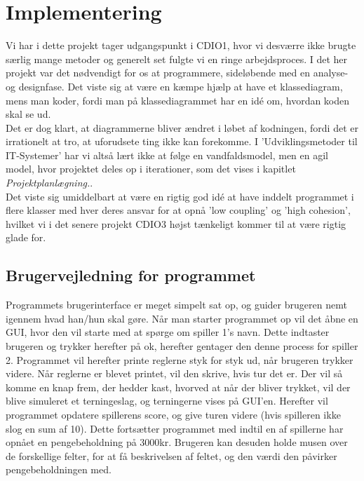 \chapter{Implementering}
Vi har i dette projekt tager udgangspunkt i CDIO1, hvor vi desværre ikke brugte særlig mange metoder og generelt set fulgte vi en ringe arbejdsproces.
I det her projekt var det nødvendigt for os at programmere, sideløbende med en analyse- og designfase.
Det viste sig at være en kæmpe hjælp at have et klassediagram, mens man koder, fordi man på klassediagrammet har en idé om, hvordan koden skal se ud.
\\
Det er dog klart, at diagrammerne bliver ændret i løbet af kodningen, fordi det er irrationelt at tro, at uforudsete ting ikke kan forekomme.
I 'Udviklingsmetoder til IT-Systemer' har vi altså lært ikke at følge en vandfaldsmodel, men en agil model, hvor projektet deles op i iterationer, som det vises i kapitlet \textit{Projektplanlægning.}.
\\
Det viste sig umiddelbart at være en rigtig god idé at have inddelt programmet i flere klasser med hver deres ansvar for at opnå 'low coupling' og 'high cohesion', hvilket vi i det senere projekt CDIO3 højst tænkeligt kommer til at være rigtig glade for.

\section{Brugervejledning for programmet}
Programmets brugerinterface er meget simpelt sat op, og guider brugeren nemt igennem hvad han/hun skal gøre. 
Når man starter programmet op vil det åbne en GUI, hvor den vil starte med at spørge om spiller 1's navn. 
Dette indtaster brugeren og trykker herefter på ok, herefter gentager den denne process for spiller 2. 
Programmet vil herefter printe reglerne styk for styk ud, når brugeren trykker videre. 
Når reglerne er blevet printet, vil den skrive, hvis tur det er. 
Der vil så komme en knap frem, der hedder kast, hvorved at når der bliver trykket, vil der blive simuleret et terningeslag, og terningerne vises på GUI'en. 
Herefter vil programmet opdatere spillerens score, og give turen videre (hvis spilleren ikke slog en sum af 10). 
Dette fortsætter programmet med indtil en af spillerne har opnået en pengebeholdning på 3000kr. 
Brugeren kan desuden holde musen over de forskellige felter, for at få beskrivelsen af feltet, og den værdi den påvirker pengebeholdningen med.
